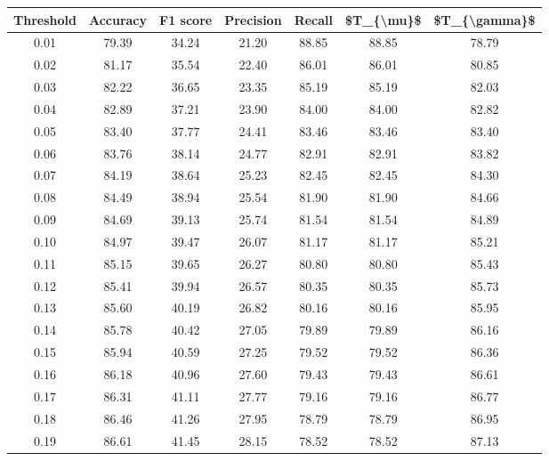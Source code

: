 \begin{tabular}{|c|c|c|c|c|c|c|}
\hline
 Threshold &  Accuracy &  F1 score &  Precision &  Recall &  \$T\_\{\textbackslash mu\}\$ &  \$T\_\{\textbackslash gamma\}\$ \\
\hline
      0.01 &     79.39 &     34.24 &      21.20 &   88.85 &      88.85 &         78.79 \\
      0.02 &     81.17 &     35.54 &      22.40 &   86.01 &      86.01 &         80.85 \\
      0.03 &     82.22 &     36.65 &      23.35 &   85.19 &      85.19 &         82.03 \\
      0.04 &     82.89 &     37.21 &      23.90 &   84.00 &      84.00 &         82.82 \\
      0.05 &     83.40 &     37.77 &      24.41 &   83.46 &      83.46 &         83.40 \\
      0.06 &     83.76 &     38.14 &      24.77 &   82.91 &      82.91 &         83.82 \\
      0.07 &     84.19 &     38.64 &      25.23 &   82.45 &      82.45 &         84.30 \\
      0.08 &     84.49 &     38.94 &      25.54 &   81.90 &      81.90 &         84.66 \\
      0.09 &     84.69 &     39.13 &      25.74 &   81.54 &      81.54 &         84.89 \\
      0.10 &     84.97 &     39.47 &      26.07 &   81.17 &      81.17 &         85.21 \\
      0.11 &     85.15 &     39.65 &      26.27 &   80.80 &      80.80 &         85.43 \\
      0.12 &     85.41 &     39.94 &      26.57 &   80.35 &      80.35 &         85.73 \\
      0.13 &     85.60 &     40.19 &      26.82 &   80.16 &      80.16 &         85.95 \\
      0.14 &     85.78 &     40.42 &      27.05 &   79.89 &      79.89 &         86.16 \\
      0.15 &     85.94 &     40.59 &      27.25 &   79.52 &      79.52 &         86.36 \\
      0.16 &     86.18 &     40.96 &      27.60 &   79.43 &      79.43 &         86.61 \\
      0.17 &     86.31 &     41.11 &      27.77 &   79.16 &      79.16 &         86.77 \\
      0.18 &     86.46 &     41.26 &      27.95 &   78.79 &      78.79 &         86.95 \\
      0.19 &     86.61 &     41.45 &      28.15 &   78.52 &      78.52 &         87.13 \\

\end{tabular}
